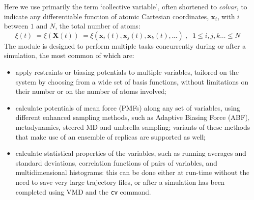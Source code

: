 Here we use primarily the term `collective variable', often shortened to \textit{colvar}, to indicate any differentiable function of atomic Cartesian coordinates, $\bm{x}_{i}$, with $i$ between $1$ and $N$, the total
number of atoms:
\begin{equation}
  \label{eq:colvar_basic}
  \xi(t) \; = \xi(\bm{X}(t)) \; = \xi\left(\bm{x}_{i}(t), \bm{x}_{j}(t), \bm{x}_{k}(t),
  \ldots \right)\;, \;\; 1 \leq i,j,k\ldots \leq N
\end{equation}
The module is designed to perform multiple tasks concurrently during or after a simulation, the most common of which are:
\begin{itemize}

\item apply restraints or biasing potentials to multiple variables, tailored on the system by choosing from a wide set of basis functions, without limitations on their number or on the number of atoms involved; 

\item calculate potentials of mean force (PMFs) along any set of variables, using different enhanced sampling methods, such as Adaptive Biasing Force (ABF), metadynamics, steered MD and umbrella sampling; variants of these methods that make use of an ensemble of replicas are supported as well;

\item calculate statistical properties of the variables, such as running averages and standard deviations, correlation functions of pairs of variables, and multidimensional histograms: this can be done either at run-time without the need to save very large trajectory files, or after a simulation has been completed using VMD and the \texttt{cv} command.

\end{itemize}


